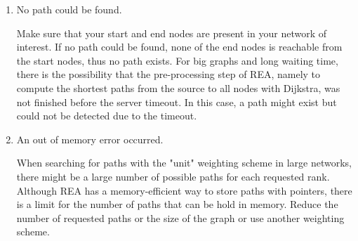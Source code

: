 \begin{enumerate}

\item No path could be found.

 Make sure that your start and end nodes are present in your network of interest. If no path could be found, none
 of the end nodes is reachable from the start nodes, thus no path exists. For big graphs and long waiting time, there is the possibility that
 the pre-processing step of REA, namely to compute the shortest paths from the source to all nodes with Dijkstra, was not finished before
 the server timeout. In this case, a path might exist but could not be detected due to the timeout. 

\item An out of memory error occurred. 

 When searching for paths with the "unit" weighting scheme in large networks, there might be 
 a large number of possible paths for each requested rank.  Although REA has a memory-efficient
 way to store paths with pointers, there is a limit for the number of paths that can be hold in memory. 
 Reduce the number of requested paths or the size of the graph or use another weighting scheme. 
   
\end{enumerate}







